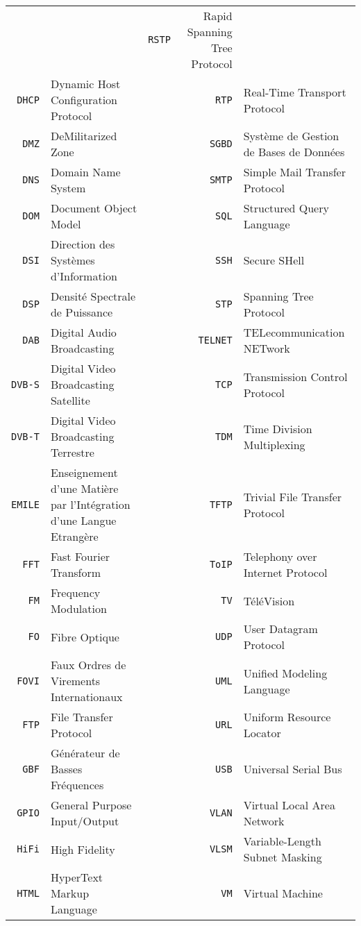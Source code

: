 \begin{tabular}{rp{6.5cm}p{0.5cm}rp{6.5cm}}
 & & 
\texttt{RSTP} & Rapid Spanning Tree Protocol
\\ 
\texttt{DHCP} & Dynamic Host Configuration Protocol
 & & 
\texttt{RTP} & Real-Time Transport Protocol
\\ 
\texttt{DMZ} & DeMilitarized Zone
 & & 
\texttt{SGBD} & Système de Gestion de Bases de Données
\\ 
\texttt{DNS} & Domain Name System
 & & 
\texttt{SMTP} & Simple Mail Transfer Protocol
\\ 
\texttt{DOM} & Document Object Model
 & & 
\texttt{SQL} & Structured Query Language
\\ 
\texttt{DSI} & Direction des Systèmes d'Information
 & & 
\texttt{SSH} & Secure SHell
\\ 
\texttt{DSP} & Densité Spectrale de Puissance
 & & 
\texttt{STP} & Spanning Tree Protocol
\\ 
\texttt{DAB} & Digital Audio Broadcasting
 & & 
\texttt{TELNET} & TELecommunication NETwork
\\ 
\texttt{DVB-S} & Digital Video Broadcasting Satellite
 & & 
\texttt{TCP} & Transmission Control Protocol
\\ 
\texttt{DVB-T} & Digital Video Broadcasting Terrestre
 & & 
\texttt{TDM} & Time Division Multiplexing
\\ 
\texttt{EMILE} & Enseignement d'une Matière par l'Intégration d'une Langue Etrangère
 & & 
\texttt{TFTP} & Trivial File Transfer Protocol
\\ 
\texttt{FFT} & Fast Fourier Transform
 & & 
\texttt{ToIP} & Telephony over Internet Protocol
\\ 
\texttt{FM} & Frequency Modulation
 & & 
\texttt{TV} & TéléVision
\\ 
\texttt{FO} & Fibre Optique
 & & 
\texttt{UDP} & User Datagram Protocol
\\ 
\texttt{FOVI} & Faux Ordres de Virements Internationaux
 & & 
\texttt{UML} & Unified Modeling Language
\\ 
\texttt{FTP} & File Transfer Protocol
 & & 
\texttt{URL} & Uniform Resource Locator
\\ 
\texttt{GBF} & Générateur de Basses Fréquences
 & & 
\texttt{USB} & Universal Serial Bus
\\ 
\texttt{GPIO} & General Purpose Input/Output
 & & 
\texttt{VLAN} & Virtual Local Area Network
\\ 
\texttt{HiFi} & High Fidelity
 & & 
\texttt{VLSM} & Variable-Length Subnet Masking
\\ 
\texttt{HTML} & HyperText Markup Language
 & & 
\texttt{VM} & Virtual Machine

\end{tabular}
